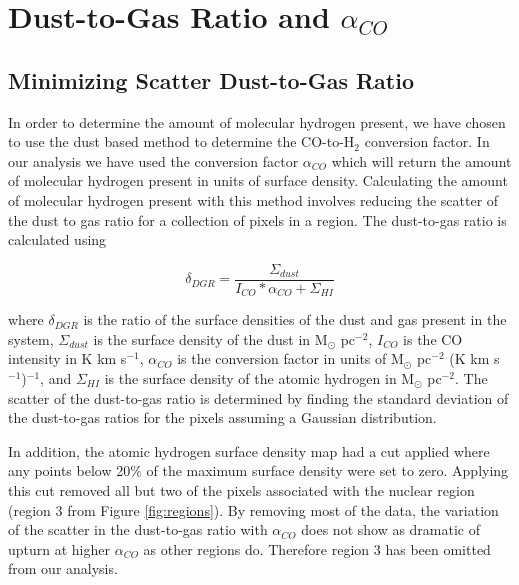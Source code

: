 \chapter{Dust-to-Gas Ratio and $\alpha_{CO}$}

\section{Minimizing Scatter Dust-to-Gas Ratio}

In order to determine the amount of molecular hydrogen present, we have chosen to use the dust based method to determine the CO-to-H$_2$ conversion factor.  In our analysis we have used the conversion factor $\alpha_{CO}$ which will return the amount of molecular hydrogen present in units of surface density.  Calculating the amount of molecular hydrogen present with this method involves reducing the scatter of the dust to gas ratio for a collection of pixels in a region.  The dust-to-gas ratio is calculated using

\begin{equation}\label{eq:dgr}
  \delta_{DGR} = \frac{\Sigma_{dust}}{I_{CO}*\alpha_{CO} + \Sigma_{HI}}
\end{equation}

\noindent where $\delta_{DGR}$ is the ratio of the surface densities of the dust and gas present in the system, $\Sigma_{dust}$ is the surface density of the dust in M$_\odot$ pc$^{-2}$, $I_{CO}$ is the CO intensity in K km s$^{-1}$, $\alpha_{CO}$ is the conversion factor in units of M$_\odot$ pc$^{-2}$ (K km s$^{-1}$)$^{-1}$, and $\Sigma_{HI}$ is the surface density of the atomic hydrogen in M$_\odot$ pc$^{-2}$.  The scatter of the dust-to-gas ratio is determined by finding the standard deviation of the dust-to-gas ratios for the pixels assuming a Gaussian distribution.  

In addition, the atomic hydrogen surface density map had a cut applied where any points below 20\% of the maximum surface density were set to zero.  Applying this cut removed all but two of the pixels associated with the nuclear region (region 3 from Figure \ref{fig:regions}).  By removing most of the data, the variation of the scatter in the dust-to-gas ratio with $\alpha_{CO}$ does not show as dramatic of upturn at higher $\alpha_{CO}$ as other regions do.  Therefore region 3 has been omitted from our analysis.

